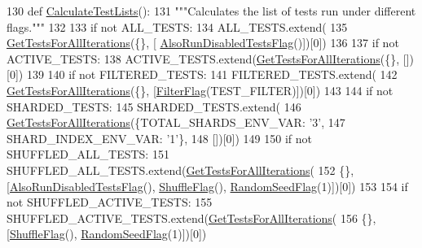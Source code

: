 \begin{DoxyCode}
130 \textcolor{keyword}{def }\hyperlink{namespacegtest__shuffle__test_a51dcc55df3ebd76c676298ef9b4fea19}{CalculateTestLists}():
131   \textcolor{stringliteral}{"""Calculates the list of tests run under different flags."""}
132 
133   \textcolor{keywordflow}{if} \textcolor{keywordflow}{not} ALL\_TESTS:
134     ALL\_TESTS.extend(
135         \hyperlink{namespacegtest__shuffle__test_a18c7606bf0d41acb73a4a6a2994d36fc}{GetTestsForAllIterations}(\{\}, [
      \hyperlink{namespacegtest__shuffle__test_a91033ae962b37f040a95fb90062aacb3}{AlsoRunDisabledTestsFlag}()])[0])
136 
137   \textcolor{keywordflow}{if} \textcolor{keywordflow}{not} ACTIVE\_TESTS:
138     ACTIVE\_TESTS.extend(\hyperlink{namespacegtest__shuffle__test_a18c7606bf0d41acb73a4a6a2994d36fc}{GetTestsForAllIterations}(\{\}, [])[0])
139 
140   \textcolor{keywordflow}{if} \textcolor{keywordflow}{not} FILTERED\_TESTS:
141     FILTERED\_TESTS.extend(
142         \hyperlink{namespacegtest__shuffle__test_a18c7606bf0d41acb73a4a6a2994d36fc}{GetTestsForAllIterations}(\{\}, [\hyperlink{namespacegtest__shuffle__test_aa849ecba21a2796be477040bd303b700}{FilterFlag}(TEST\_FILTER)])[0])
143 
144   \textcolor{keywordflow}{if} \textcolor{keywordflow}{not} SHARDED\_TESTS:
145     SHARDED\_TESTS.extend(
146         \hyperlink{namespacegtest__shuffle__test_a18c7606bf0d41acb73a4a6a2994d36fc}{GetTestsForAllIterations}(\{TOTAL\_SHARDS\_ENV\_VAR: \textcolor{stringliteral}{'3'},
147                                   SHARD\_INDEX\_ENV\_VAR: \textcolor{stringliteral}{'1'}\},
148                                  [])[0])
149 
150   \textcolor{keywordflow}{if} \textcolor{keywordflow}{not} SHUFFLED\_ALL\_TESTS:
151     SHUFFLED\_ALL\_TESTS.extend(\hyperlink{namespacegtest__shuffle__test_a18c7606bf0d41acb73a4a6a2994d36fc}{GetTestsForAllIterations}(
152         \{\}, [\hyperlink{namespacegtest__shuffle__test_a91033ae962b37f040a95fb90062aacb3}{AlsoRunDisabledTestsFlag}(), \hyperlink{namespacegtest__shuffle__test_ab593e060bf2a9b2f0cb0dc8e18eb2088}{ShuffleFlag}(), 
      \hyperlink{namespacegtest__shuffle__test_aaf2a94c748f266c4267ac7e7bb3451fd}{RandomSeedFlag}(1)])[0])
153 
154   \textcolor{keywordflow}{if} \textcolor{keywordflow}{not} SHUFFLED\_ACTIVE\_TESTS:
155     SHUFFLED\_ACTIVE\_TESTS.extend(\hyperlink{namespacegtest__shuffle__test_a18c7606bf0d41acb73a4a6a2994d36fc}{GetTestsForAllIterations}(
156         \{\}, [\hyperlink{namespacegtest__shuffle__test_ab593e060bf2a9b2f0cb0dc8e18eb2088}{ShuffleFlag}(), \hyperlink{namespacegtest__shuffle__test_aaf2a94c748f266c4267ac7e7bb3451fd}{RandomSeedFlag}(1)])[0])

\end{DoxyCode}
